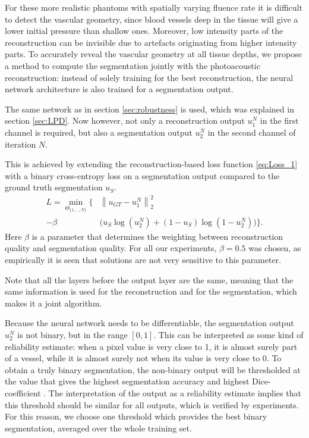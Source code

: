 \documentclass[journal]{IEEEtran}
\newcommand{\norm}[1]{\left\lVert#1\right\rVert}
\newcommand{\hl}[1]{\cbcolor{red}\begin{changebar}{\color{red} #1}\end{changebar}}
\begin{document}
For these more realistic phantoms with spatially varying fluence rate it is difficult to detect the vascular geometry, since blood vessels deep in the tissue will give a lower initial pressure than shallow ones. Moreover, low intensity parts of the reconstruction can be invisible due to artefacts originating from higher intensity parts. To accurately reveal the vascular geometry at all tissue depths, we propose a method to compute the segmentation jointly with the photoacoustic reconstruction: instead of solely training for the best reconstruction, the neural network architecture is also trained for a segmentation output. \hl{The same network as in section \ref{sec:robustness} is used, which was explained in section \ref{sec:LPD}. Now however, not only a reconstruction output $u_1^N$ in the first channel is required, but also a segmentation output $u_2^N$ in the second channel of iteration $N$.} This is achieved by extending the reconstruction-based loss function \eqref{eq:Loss_1} with a binary cross-entropy loss on a segmentation output compared to the ground truth segmentation $u_S$.
\begin{align}\label{eq:Loss_2}
L=\min_{\Theta_{\{1,\dots,N\}}}\Big\{&\norm{u_{GT}-u_1^N}^2_2 \\- \beta &\Big(u_S\log(u_2^N)+(1-u_S)\log(1-u_2^N)\Big)\Big\}.\nonumber
\end{align}
Here $\beta$ is a parameter that determines the weighting between reconstruction quality and segmentation quality. For all our experiments, $\beta=0.5$ was chosen, as empirically it is seen that solutions are not very sensitive to this parameter. \hl{Note that all the layers before the output layer are the same, meaning that the same information is used for the reconstruction and for the segmentation, which makes it a joint algorithm.}

Because the neural network needs to be differentiable, the segmentation output $u_2^N$ is not binary, but in the range $[0,1]$. This can be interpreted as some kind of reliability estimate: when a pixel value is very close to 1, it is almost surely part of a vessel, while it is almost surely not when its value is very close to 0. To obtain a truly binary segmentation, the non-binary output will be thresholded at the value that gives the highest segmentation accuracy and highest Dice-coefficient \cite{Zijdenbos1994}. The interpretation of the output as a reliability estimate implies that this threshold should be similar for all outputs, which is verified by experiments. For this reason, we choose one threshold which provides the best binary segmentation, averaged over the whole training set.
\end{document}
